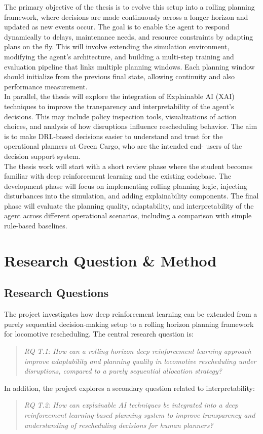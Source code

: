\documentclass[a4paper]{scrartcl}
\begin{document}
The primary objective of the thesis is to evolve this setup into a rolling planning framework,
where decisions are made continuously across a longer horizon and updated as new events
occur. The goal is to enable the agent to respond dynamically to delays, maintenance needs,
and resource constraints by adapting plans on the fly. This will involve extending the
simulation environment, modifying the agent’s architecture, and building a multi-step training
and evaluation pipeline that links multiple planning windows. Each planning window should
initialize from the previous final state, allowing continuity and also performance
measurement.\\
In parallel, the thesis will explore the integration of Explainable AI (XAI) techniques to
improve the transparency and interpretability of the agent’s decisions. This may include
policy inspection tools, visualizations of action choices, and analysis of how disruptions
influence rescheduling behavior. The aim is to make DRL-based decisions easier to
understand and trust for the operational planners at Green Cargo, who are the intended end-
users of the decision support system.\\
The thesis work will start with a short review phase where the student becomes familiar with
deep reinforcement learning and the existing codebase. The development phase will focus on
implementing rolling planning logic, injecting disturbances into the simulation, and adding
explainability components. The final phase will evaluate the planning quality, adaptability,
and interpretability of the agent across different operational scenarios, including a
comparison with simple rule-based baselines.
\section{Research Question \& Method}
\subsection{Research Questions}
The project investigates how deep reinforcement learning can be extended from a purely sequential decision-making setup to a rolling horizon planning framework for locomotive rescheduling. The central research question is:
\begin{quote}\emph{RQ T.1: How can a rolling horizon deep reinforcement learning approach improve adaptability and planning quality in locomotive rescheduling under disruptions, compared to a purely sequential allocation strategy?}\end{quote}
In addition, the project explores a secondary question related to interpretability:
\begin{quote}\emph{RQ T.2: How can explainable AI techniques be integrated into a deep reinforcement learning-based planning system to improve transparency and understanding of rescheduling decisions for human planners?}\end{quote}
\end{document}
